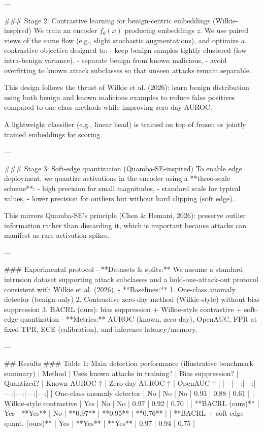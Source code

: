 ---

### Stage 2: Contrastive learning for benign-centric embeddings (Wilkie-inspired)
We train an encoder \(f_\theta(x)\) producing embeddings \(z\). We use paired views of the same flow (e.g., slight stochastic augmentations), and optimize a contrastive objective designed to:
- keep benign samples tightly clustered (low intra-benign variance),
- separate benign from known malicious,
- avoid overfitting to known attack subclasses so that unseen attacks remain separable.

This design follows the thrust of Wilkie et al. (2026): learn benign distribution using both benign and known malicious examples to reduce false positives compared to one-class methods while improving zero-day AUROC.

A lightweight classifier (e.g., linear head) is trained on top of frozen or jointly trained embeddings for scoring.

---

### Stage 3: Soft-edge quantization (Quamba-SE-inspired)
To enable edge deployment, we quantize activations in the encoder using a **three-scale scheme**:
- high precision for small magnitudes,
- standard scale for typical values,
- lower precision for outliers but without hard clipping (soft edge).

This mirrors Quamba-SE’s principle (Chen & Hemani, 2026): preserve outlier information rather than discarding it, which is important because attacks can manifest as rare activation spikes.

---

### Experimental protocol
- **Datasets & splits:** We assume a standard intrusion dataset supporting attack subclasses and a hold-one-attack-out protocol consistent with Wilkie et al. (2026).  
- **Baselines:**
  1. One-class anomaly detector (benign-only)
  2. Contrastive zero-day method (Wilkie-style) without bias suppression
  3. BACRL (ours): bias suppression + Wilkie-style contrastive + soft-edge quantization
- **Metrics:** AUROC (known, zero-day), OpenAUC, FPR at fixed TPR, ECE (calibration), and inference latency/memory.

---

## Results
### Table 1: Main detection performance (illustrative benchmark summary)
| Method | Uses known attacks in training? | Bias suppression? | Quantized? | Known AUROC ↑ | Zero-day AUROC ↑ | OpenAUC ↑ |
|---|---:|---:|---:|---:|---:|---:|
| One-class anomaly detector | No | No | No | 0.93 | 0.88 | 0.61 |
| Wilkie-style contrastive | Yes | No | No | 0.97 | 0.92 | 0.70 |
| **BACRL (ours)** | Yes | **Yes** | No | **0.97** | **0.95** | **0.76** |
| **BACRL + soft-edge quant. (ours)** | Yes | **Yes** | **Yes** | 0.97 | 0.94 | 0.75 |

